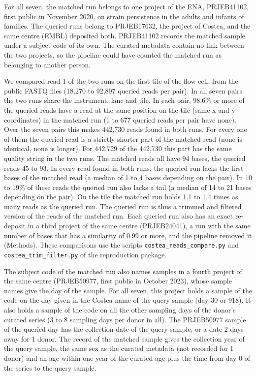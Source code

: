 \documentclass[11pt,a4paper]{article}
\begin{document}
For all seven, the matched run belongs to one project of the ENA, PRJEB41102, first public in November 2020, on strain persistence in the adults and infants of families. The queried runs belong to PRJEB17632, the project of Costea, and the same centre (EMBL) deposited both. PRJEB41102 records the matched sample under a subject code of its own. The curated metadata contain no link between the two projects, so the pipeline could have counted the matched run as belonging to another person.

We compared read 1 of the two runs on the first tile of the flow cell, from the public FASTQ files (18,270 to 92,897 queried reads per pair). In all seven pairs the two runs share the instrument, lane and tile. In each pair, 98.6\% or more of the queried reads have a read at the same position on the tile (same x and y coordinates) in the matched run (1 to 677 queried reads per pair have none). Over the seven pairs this makes 442,730 reads found in both runs. For every one of them the queried read is a strictly shorter part of the matched read (none is identical, none is longer). For 442,729 of the 442,730 this part has the same quality string in the two runs. The matched reads all have 94 bases, the queried reads 45 to 93. In every read found in both runs, the queried run lacks the first bases of the matched read (a median of 1 to 4 bases depending on the pair). In 10 to 19\% of these reads the queried run also lacks a tail (a median of 14 to 21 bases depending on the pair). On the tile the matched run holds 1.1 to 1.4 times as many reads as the queried run. The queried run is thus a trimmed and filtered version of the reads of the matched run. Each queried run also has an exact re-deposit in a third project of the same centre (PRJEB24041), a run with the same number of bases that has a similarity of 0.99 or more, and the pipeline removed it (Methods). These comparisons use the scripts \texttt{costea\_reads\_compare.py} and \texttt{costea\_trim\_filter.py} of the reproduction package.

The subject code of the matched run also names samples in a fourth project of the same centre (PRJEB50977, first public in October 2023), whose sample names give the day of the sample. For all seven, this project holds a sample of the code on the day given in the Costea name of the query sample (day 30 or 918). It also holds a sample of the code on all the other sampling days of the donor's curated series (3 to 8 sampling days per donor in all). The PRJEB50977 sample of the queried day has the collection date of the query sample, or a date 2 days away for 1 donor. The record of the matched sample gives the collection year of the query sample, the same sex as the curated metadata (not recorded for 1 donor) and an age within one year of the curated age plus the time from day 0 of the series to the query sample.
\end{document}
